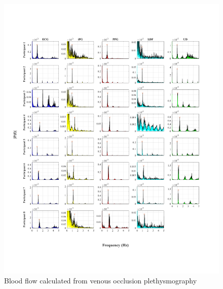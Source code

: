 \begin{figure}[!htpb]
	\includegraphics[width=1\textwidth,keepaspectratio,trim={0.75cm 0cm 2cm 2cm},clip]{figure1}    
	\caption[Fequency components of the signals acquired]{Blood flow calculated from venous occlusion plethysmography}
	\label{fig:fft signals}
\end{figure}

